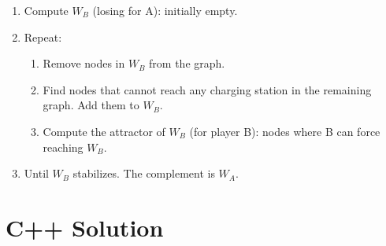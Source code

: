 \documentclass[11pt,a4paper]{article}
\begin{document}
\begin{enumerate}
  \item Compute $W_B$ (losing for A): initially empty.
  \item Repeat:
    \begin{enumerate}
      \item Remove nodes in $W_B$ from the graph.
      \item Find nodes that cannot reach any charging station in the remaining graph. Add them to $W_B$.
      \item Compute the attractor of $W_B$ (for player B): nodes where B can force reaching $W_B$.
    \end{enumerate}
  \item Until $W_B$ stabilizes. The complement is $W_A$.
\end{enumerate}

\section{C++ Solution}
\end{document}
